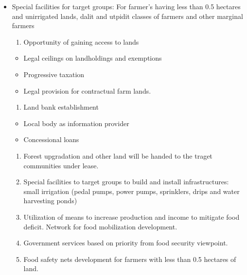 \documentclass[
  openany]{book}
\providecommand{\tightlist}{%
  \setlength{\itemsep}{0pt}\setlength{\parskip}{0pt}}
\begin{document}
\begin{itemize}
\tightlist
\item
  Special facilities for target groups: For farmer's having less than 0.5 hectares and unirrigated lands, dalit and utpidit classes of farmers and other marginal farmers

  \begin{enumerate}
  \def\labelenumi{\arabic{enumi}.}
  \tightlist
  \item
    Opportunity of gaining access to lands
  \end{enumerate}

  \begin{itemize}
  \tightlist
  \item
    Legal ceilings on landholdings and exemptions
  \item
    Progressive taxation
  \item
    Legal provision for contractual farm lands.
  \end{itemize}

  \begin{enumerate}
  \def\labelenumi{\arabic{enumi}.}
  \setcounter{enumi}{1}
  \tightlist
  \item
    Land bank establishment
  \end{enumerate}

  \begin{itemize}
  \tightlist
  \item
    Local body as information provider
  \item
    Concessional loans
  \end{itemize}

  \begin{enumerate}
  \def\labelenumi{\arabic{enumi}.}
  \setcounter{enumi}{2}
  \tightlist
  \item
    Forest upgradation and other land will be handed to the traget communities under lease.
  \item
    Special facilities to target groups to build and install infrastructures: small irrigation (pedal pumps, power pumps, sprinklers, drips and water harvesting ponds)
  \item
    Utilization of means to increase production and income to mitigate food deficit. Network for food mobilization development.
  \item
    Government services based on priority from food security viewpoint.
  \item
    Food safety nets development for farmers with less than 0.5 hectares of land.
  \end{enumerate}
\end{itemize}
\end{document}
